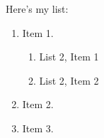 \documentclass[12pt]{article}
\begin{document}
\renewcommand{\labelenumi}{\Roman{enumi}.}
\renewcommand{\labelenumii}{\Roman{enumi}. \alph{enumii}}

\noindent Here's my list:

\begin{enumerate}
\item Item 1.
\begin{enumerate}
\item List 2, Item 1
\item List 2, Item 2
\end{enumerate}
\item Item 2.
\item Item 3.
\end{enumerate}
\end{document}
